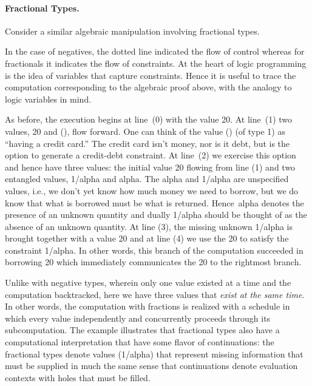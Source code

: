\documentclass[preprint]{sigplanconf}
\begin{document}
\paragraph*{Fractional Types.} 
Consider a similar algebraic manipulation involving fractional types.
\begin{center}
\end{center}
In the case of negatives, the dotted line indicated the flow of control
whereas for fractionals it indicates the flow of constraints. At the heart of
logic programming is the idea of variables that capture constraints. Hence it
is useful to trace the computation corresponding to the algebraic proof
above, with the analogy to logic variables in mind.

As before, the execution begins at line~(0) with the value {{20}}. At
line~(1) two values, {{20}} and {{()}}, flow forward. One can think of the
value {{()}} (of type {{1}}) as ``having a credit card.'' The credit card
isn't money, nor is it debt, but is the option to generate a credit-debt
constraint.  At line~(2) we exercise this option and hence have three values:
the initial value {{20}} flowing from line (1) and two entangled values,
{{1/alpha}} and {{alpha}}. The {{alpha}} and {{1/alpha}} are unspecified
values, i.e., we don't yet know how much money we need to borrow, but we do
know that what is borrowed must be what is returned. Hence~{{alpha}} denotes
the presence of an unknown quantity and dually {{1/alpha}} should be thought
of as the absence of an unknown quantity. At line (3), the missing unknown
{{1/alpha}} is brought together with a value {{20}} and at line (4) we use
the {{20}} to satisfy the constraint {{1/alpha}}. In other words, this branch
of the computation succeeded in borrowing {{20}} which immediately
communicates the {{20}} to the rightmost branch.

Unlike with negative types, wherein only one value existed at a time and the
computation backtracked, here we have three values that \emph{exist at the
  same time}. In other words, the computation with fractions is realized with
a schedule in which every value independently and concurrently proceeds
through its subcomputation. The example illustrates that fractional types
also have a computational interpretation that have some flavor of
continuations: the fractional types denote values ({{1/alpha}}) that
represent missing information that must be supplied in much the same sense
that continuations denote evaluation contexts with holes that must be filled.
\end{document}
